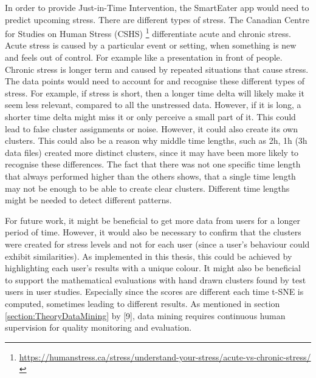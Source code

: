In order to provide Just-in-Time Intervention, the SmartEater app would need to predict upcoming stress. There are different types of stress. The Canadian Centre for Studies on Human Stress (CSHS) \footnote{\url{https://humanstress.ca/stress/understand-your-stress/acute-vs-chronic-stress/}} differentiate acute and chronic stress. Acute stress is caused by a particular event or setting, when something is new and feels out of control. For example like a presentation in front of people. Chronic stress is longer term and caused by repeated situations that cause stress. The data points would need to account for and recognise these different types of stress. For example, if stress is short, then a longer time delta will likely make it seem less relevant, compared to all the unstressed data. However, if it is long, a shorter time delta might miss it or only perceive a small part of it. This could lead to false cluster assignments or noise. However, it could also create its own clusters. This could also be a reason why middle time lengths, such as 2h, 1h (3h data files) created more distinct clusters, since it may have been more likely to recognise these differences. The fact that there was not one specific time length that always performed higher than the others shows, that a single time length may not be enough to be able to create clear clusters. Different time lengths might be needed to detect different patterns.



For future work, it might be beneficial to get more data from users for a longer period of time. However, it would also be necessary to confirm that the clusters were created for stress levels and not for each user (since a user's behaviour could exhibit similarities). As implemented in this thesis, this could be achieved by highlighting each user's results with a unique colour. It might also be beneficial to support the mathematical evaluations with hand drawn clusters found by test users in user studies. Especially since the scores are different each time t-SNE is computed, sometimes leading to different results. As mentioned in section \ref{section:TheoryDataMining} by \textcite{DataMiningAndPredictiveAnalytics}[9], data mining requires continuous human supervision for quality monitoring and evaluation.

